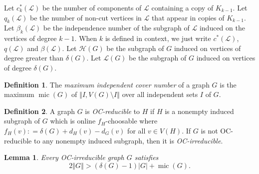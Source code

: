 \documentclass[12pt]{article}
\title{}
\author{}
\theoremstyle{plain}
\newtheorem{lem}[thm]{Lemma}
\theoremstyle{definition}
\newtheorem{defn}{Definition}
\theoremstyle{remark}
\newcommand{\fancy}[1]{\mathcal{#1}}
\renewcommand{\L}{\fancy{L}}
\newcommand{\HH}{\fancy{H}}
\newcommand{\card}[1]{\left|#1\right|}
\newcommand{\size}[1]{\left\Vert#1\right\Vert}
\newcommand{\DefinedAs}{\mathrel{\mathop:}=}
\newcommand{\mic}{\operatorname{mic}}
\begin{document}
\maketitle

Let $c_k^*(\L)$ be the number of components of $\L$ containing a copy of $K_{k-1}$. Let $q_k(\L)$ be the number of non-cut vertices in $\L$ that appear in copies of $K_{k-1}$.  
Let $\beta_k(\L)$ be the independence number of the subgraph of $\L$ induced on the vertices of degree $k-1$.  
When $k$ is defined in context, we just write $c^*(\L)$, $q(\L)$ and $\beta(\L)$.  Let $\HH(G)$ be the subgraph of $G$ induced on vertices of degree greater than $\delta(G)$.
Let $\L(G)$ be the subgraph of $G$ induced on vertices of degree $\delta(G)$.
\begin{defn} The \emph{maximum independent cover number }of a graph $G$
	is the maximum $\mic(G)$ of $\size{I, V(G) \setminus I}$ over all independent sets $I$
	of $G$. 
\end{defn}

\begin{defn} A graph $G$ is \emph{OC-reducible} to $H$ if $H$ is a nonempty induced
subgraph of $G$ which is online $f_{H}$-choosable where $f_{H}(v)\DefinedAs\delta(G)+d_{H}(v)-d_{G}(v)$
for all $v\in V(H)$. If $G$ is not OC-reducible to any nonempty induced subgraph,
then it is \emph{OC-irreducible}. 
\end{defn}

\begin{lem}\label{ConsantListMicStrength} 
	Every OC-irreducible graph $G$ satisfies
	\[2\size{G} > (\delta(G) - 1)\card{G} + \mic(G).\]
\end{lem}
\end{document}

